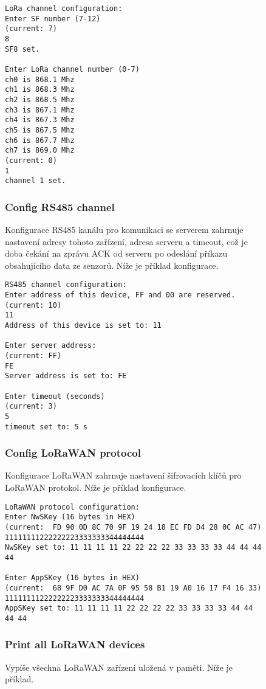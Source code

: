 \begin{figure}[!h]
\begin{lstlisting}
LoRa channel configuration:
Enter SF number (7-12)
(current: 7)
8
SF8 set.

Enter LoRa channel number (0-7)
ch0 is 868.1 Mhz
ch1 is 868.3 Mhz
ch2 is 868.5 Mhz
ch3 is 867.1 Mhz
ch4 is 867.3 Mhz
ch5 is 867.5 Mhz
ch6 is 867.7 Mhz
ch7 is 869.0 Mhz
(current: 0)
1
channel 1 set.
\end{lstlisting}


\subsubsection{Config RS485 channel}
Konfigurace RS485 kanálu pro komunikaci se serverem zahrnuje nastavení adresy tohoto zařízení, adresa serveru a timeout, což je doba čekání na zprávu ACK od serveru po odeslání příkazu obsahujícího data ze senzorů. Níže je příklad konfigurace.

\begin{lstlisting}
RS485 channel configuration:
Enter address of this device, FF and 00 are reserved.
(current: 10)
11
Address of this device is set to: 11

Enter server address: 
(current: FF)
FE
Server address is set to: FE

Enter timeout (seconds)
(current: 3)
5
timeout set to: 5 s
\end{lstlisting}


\subsubsection{Config LoRaWAN protocol}
Konfigurace LoRaWAN zahrnuje nastavení šifrovacích klíčů pro LoRaWAN protokol. Níže je příklad konfigurace.

\begin{lstlisting}
LoRaWAN protocol configuration:
Enter NwSKey (16 bytes in HEX)
(current:  FD 90 0D 8C 70 9F 19 24 18 EC FD D4 28 0C AC 47)
11111111222222223333333344444444
NwSKey set to: 11 11 11 11 22 22 22 22 33 33 33 33 44 44 44 44

Enter AppSKey (16 bytes in HEX)
(current:  68 9F D0 AC 7A 0F 95 58 B1 19 A0 16 17 F4 16 33)
11111111222222223333333344444444
AppSKey set to: 11 11 11 11 22 22 22 22 33 33 33 33 44 44 44 44
\end{lstlisting}




\subsubsection{Print all LoRaWAN devices}
Vypíše všechna LoRaWAN zařízení uložená v paměti. Níže je příklad.



\end{figure}
